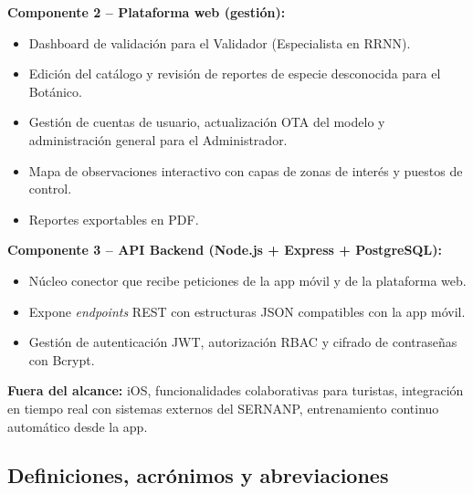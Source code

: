 \documentclass[12pt, a4paper]{article}
\begin{document}
\textbf{Componente 2 -- Plataforma web (gesti\'on):}
\begin{itemize}
  \item Dashboard de validaci\'on para el Validador (Especialista en RRNN).
  \item Edici\'on del cat\'alogo y revisi\'on de reportes de especie desconocida para el Bot\'anico.
  \item Gesti\'on de cuentas de usuario, actualizaci\'on OTA del modelo y administraci\'on general para el Administrador.
  \item Mapa de observaciones interactivo con capas de zonas de inter\'es y puestos de control.
  \item Reportes exportables en PDF.
\end{itemize}

\textbf{Componente 3 -- API Backend (Node.js + Express + PostgreSQL):}
\begin{itemize}
  \item N\'ucleo conector que recibe peticiones de la app m\'ovil y de la plataforma web.
  \item Expone \textit{endpoints} REST con estructuras JSON compatibles con la app m\'ovil.
  \item Gesti\'on de autenticaci\'on JWT, autorizaci\'on RBAC y cifrado de contrase\~nas con Bcrypt.
\end{itemize}

\textbf{Fuera del alcance:} iOS, funcionalidades colaborativas para turistas, integraci\'on en tiempo real con sistemas externos del SERNANP, entrenamiento continuo autom\'atico desde la app.

\subsection{Definiciones, acr\'onimos y abreviaciones}
\end{document}
